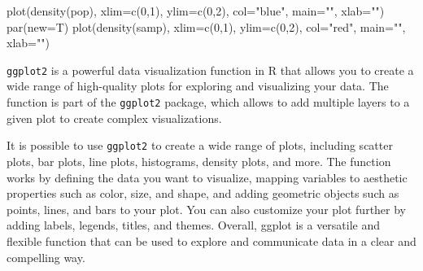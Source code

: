 \documentclass[
  letterpaper,
  DIV=11,
  numbers=noendperiod]{scrreprt}
\newenvironment{Shaded}{\begin{snugshade}}{\end{snugshade}}
\newcommand{\AttributeTok}[1]{\textcolor[rgb]{0.40,0.45,0.13}{#1}}
\newcommand{\DecValTok}[1]{\textcolor[rgb]{0.68,0.00,0.00}{#1}}
\newcommand{\FunctionTok}[1]{\textcolor[rgb]{0.28,0.35,0.67}{#1}}
\newcommand{\NormalTok}[1]{\textcolor[rgb]{0.00,0.23,0.31}{#1}}
\newcommand{\StringTok}[1]{\textcolor[rgb]{0.13,0.47,0.30}{#1}}
\begin{document}
\begin{Shaded}
\begin{Highlighting}[]
\FunctionTok{plot}\NormalTok{(}\FunctionTok{density}\NormalTok{(pop), }\AttributeTok{xlim=}\FunctionTok{c}\NormalTok{(}\DecValTok{0}\NormalTok{,}\DecValTok{1}\NormalTok{), }\AttributeTok{ylim=}\FunctionTok{c}\NormalTok{(}\DecValTok{0}\NormalTok{,}\DecValTok{2}\NormalTok{), }\AttributeTok{col=}\StringTok{"blue"}\NormalTok{, }\AttributeTok{main=}\StringTok{""}\NormalTok{, }\AttributeTok{xlab=}\StringTok{""}\NormalTok{)}
\FunctionTok{par}\NormalTok{(}\AttributeTok{new=}\NormalTok{T)}
\FunctionTok{plot}\NormalTok{(}\FunctionTok{density}\NormalTok{(samp), }\AttributeTok{xlim=}\FunctionTok{c}\NormalTok{(}\DecValTok{0}\NormalTok{,}\DecValTok{1}\NormalTok{), }\AttributeTok{ylim=}\FunctionTok{c}\NormalTok{(}\DecValTok{0}\NormalTok{,}\DecValTok{2}\NormalTok{), }\AttributeTok{col=}\StringTok{"red"}\NormalTok{, }\AttributeTok{main=}\StringTok{""}\NormalTok{, }\AttributeTok{xlab=}\StringTok{""}\NormalTok{)}
\end{Highlighting}
\end{Shaded}

\begin{tcolorbox}[enhanced jigsaw, arc=.35mm, breakable, toptitle=1mm, opacityback=0, bottomrule=.15mm, toprule=.15mm, rightrule=.15mm, titlerule=0mm, opacitybacktitle=0.6, coltitle=black, left=2mm, title=\textcolor{quarto-callout-note-color}{\faInfo}\hspace{0.5em}{Methods: \texttt{ggplot2} function of R}, bottomtitle=1mm, leftrule=.75mm, colback=white, colbacktitle=quarto-callout-note-color!10!white, colframe=quarto-callout-note-color-frame]

\texttt{ggplot2} is a powerful data visualization function in R that
allows you to create a wide range of high-quality plots for exploring
and visualizing your data. The function is part of the \texttt{ggplot2}
package, which allows to add multiple layers to a given plot to create
complex visualizations.

It is possible to use \texttt{ggplot2} to create a wide range of plots,
including scatter plots, bar plots, line plots, histograms, density
plots, and more. The function works by defining the data you want to
visualize, mapping variables to aesthetic properties such as color,
size, and shape, and adding geometric objects such as points, lines, and
bars to your plot. You can also customize your plot further by adding
labels, legends, titles, and themes. Overall, ggplot is a versatile and
flexible function that can be used to explore and communicate data in a
clear and compelling way.

\end{tcolorbox}
\end{document}
